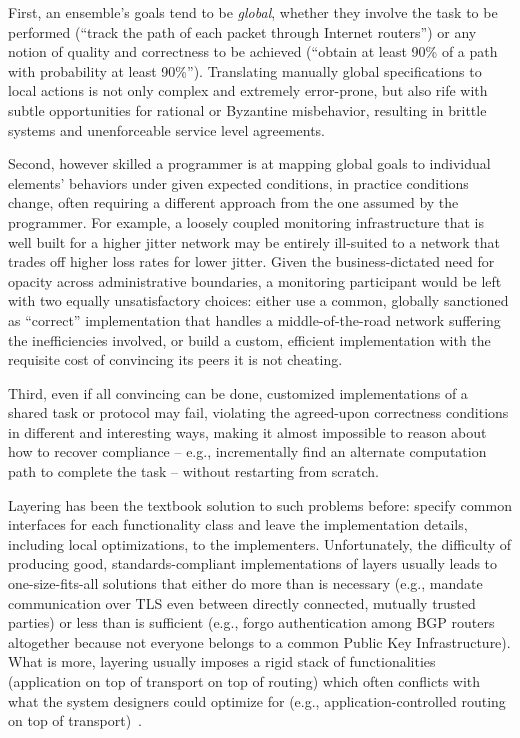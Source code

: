 \documentclass[faircopy]{sig-alternate}
\begin{document}
First, an ensemble's goals tend to be \emph{global}, whether
they involve the task to be performed (``track the path of each packet
through Internet routers'') or any notion of quality and
correctness to be achieved (``obtain at least 90\% of a path with
probability at least 90\%'').  Translating manually global
specifications to local actions is not only complex and extremely
error-prone, but also rife with subtle opportunities for rational or
Byzantine misbehavior,
resulting in brittle systems and unenforceable service level
agreements.

Second, however skilled a programmer is at mapping global goals to individual elements' behaviors under
given expected conditions, in practice conditions change, often requiring
a different approach from the one assumed by the programmer. For
example, a loosely
coupled monitoring infrastructure that is well built for a higher
jitter network may be entirely ill-suited to a network that trades off
higher loss rates for lower jitter.  Given the business-dictated need for opacity across
administrative boundaries, a monitoring participant would be
left with two equally unsatisfactory choices: either use a common, globally
sanctioned as ``correct'' implementation that handles a middle-of-the-road
network suffering the inefficiencies involved, or build a custom, efficient
implementation with the requisite cost of convincing its peers it
is not cheating.

Third, even if all convincing can be done, customized
implementations of a shared task or protocol may fail, violating
the agreed-upon correctness conditions in different and 
interesting ways, making it almost impossible to reason about how to
recover compliance -- e.g., incrementally find an alternate computation path to
complete the task -- without restarting from scratch.

Layering has been the textbook solution to such problems before: specify
common interfaces for each functionality class and leave the
implementation details, including local optimizations, to the
implementers.
Unfortunately, the difficulty of producing good,
standards-compliant implementations of layers usually leads to
one-size-fits-all
solutions that either do more than is necessary (e.g., mandate
communication over TLS  even between directly connected, mutually trusted parties) or less than is
sufficient (e.g., forgo authentication among BGP routers altogether because not
everyone belongs to a common Public Key Infrastructure). What is more,
layering usually imposes a rigid stack of functionalities (application
on top of transport on top of routing) which often conflicts with what
the system designers could optimize for (e.g., application-controlled routing on
top of transport)~\cite{Condie2005}.
\end{document}
